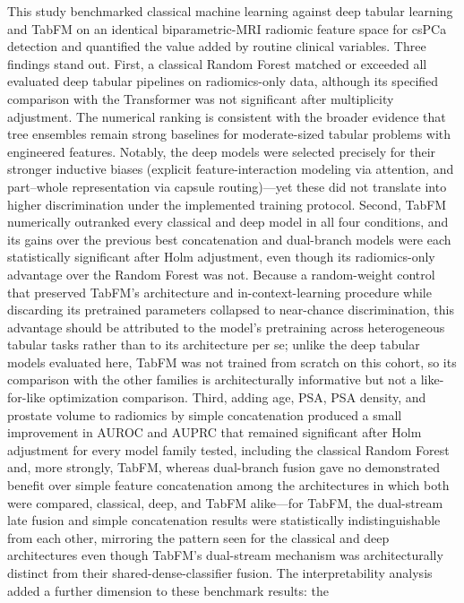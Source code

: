 \documentclass[11pt]{article}
\begin{document}
This study benchmarked classical machine learning against deep tabular learning
and TabFM on an identical
biparametric-MRI radiomic feature space for csPCa detection and quantified the
value added by routine clinical variables. Three findings stand out. First, a
classical Random Forest matched or exceeded all evaluated deep tabular
pipelines on radiomics-only data, although its specified comparison with the
Transformer was not significant after multiplicity adjustment. The numerical
ranking is consistent with the broader evidence that tree ensembles remain
strong baselines for moderate-sized tabular problems with engineered features.
Notably, the deep models were selected precisely for their stronger inductive
biases (explicit feature-interaction modeling via attention, and part--whole
representation via capsule routing)---yet these did not translate into higher
discrimination under the implemented training protocol. Second, TabFM
numerically outranked every classical and deep model in all four conditions,
and its gains over the previous best concatenation and dual-branch models were
each statistically significant after Holm adjustment, even though its
radiomics-only advantage over the Random Forest was not. Because a
random-weight control that preserved TabFM's architecture and
in-context-learning procedure while discarding its pretrained parameters
collapsed to near-chance discrimination, this advantage should be attributed to
the model's pretraining across heterogeneous tabular tasks rather than to its
architecture per se; unlike the deep tabular models evaluated here, TabFM was
not trained from scratch on this cohort, so its comparison with the other
families is architecturally informative but not a like-for-like optimization
comparison. Third, adding age, PSA,
PSA density, and prostate volume
to radiomics by simple concatenation produced a small improvement in AUROC and
AUPRC that remained significant after Holm adjustment for every model family
tested, including the classical Random Forest and, more strongly, TabFM,
whereas dual-branch fusion gave no demonstrated benefit over simple feature
concatenation among the architectures in which both were compared, classical,
deep, and TabFM alike---for TabFM, the dual-stream late fusion and simple
concatenation results were statistically indistinguishable from each other,
mirroring the pattern seen for the classical and deep architectures even though
TabFM's dual-stream mechanism was architecturally distinct from their
shared-dense-classifier fusion. The interpretability analysis added a further
dimension to these benchmark results: the
\end{document}
